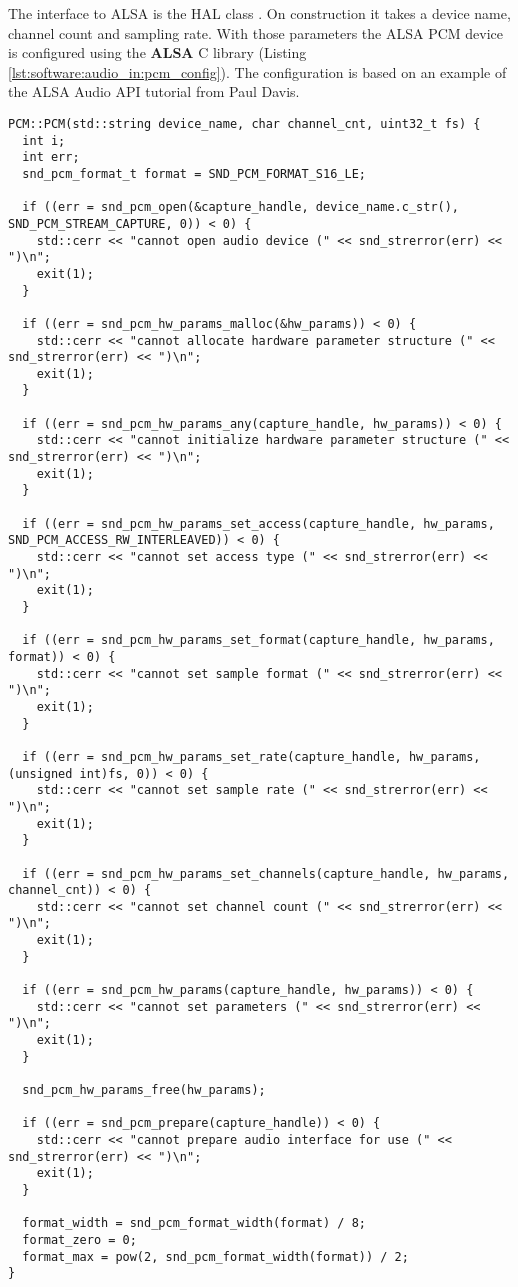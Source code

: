 The interface to ALSA is the HAL class . On construction it takes a device name, channel count and sampling rate. With those parameters the ALSA PCM device is configured using the \textbf{ALSA} C library (Listing \ref{lst:software:audio_in:pcm_config}).\cite{noauthor_alsa_nodate} The configuration is based on an example of the ALSA Audio API tutorial from Paul Davis.\cite{davis_tutorial_2002}\p
%
\begin{mdframed}
\begin{lstlisting}[caption=ALSA interface configuration, label=lst:software:audio_in:pcm_config]
PCM::PCM(std::string device_name, char channel_cnt, uint32_t fs) {
  int i;
  int err;
  snd_pcm_format_t format = SND_PCM_FORMAT_S16_LE;

  if ((err = snd_pcm_open(&capture_handle, device_name.c_str(), SND_PCM_STREAM_CAPTURE, 0)) < 0) {
    std::cerr << "cannot open audio device (" << snd_strerror(err) << ")\n";
    exit(1);
  }

  if ((err = snd_pcm_hw_params_malloc(&hw_params)) < 0) {
    std::cerr << "cannot allocate hardware parameter structure (" << snd_strerror(err) << ")\n";
    exit(1);
  }

  if ((err = snd_pcm_hw_params_any(capture_handle, hw_params)) < 0) {
    std::cerr << "cannot initialize hardware parameter structure (" << snd_strerror(err) << ")\n";
    exit(1);
  }

  if ((err = snd_pcm_hw_params_set_access(capture_handle, hw_params, SND_PCM_ACCESS_RW_INTERLEAVED)) < 0) {
    std::cerr << "cannot set access type (" << snd_strerror(err) << ")\n";
    exit(1);
  }

  if ((err = snd_pcm_hw_params_set_format(capture_handle, hw_params, format)) < 0) {
    std::cerr << "cannot set sample format (" << snd_strerror(err) << ")\n";
    exit(1);
  }

  if ((err = snd_pcm_hw_params_set_rate(capture_handle, hw_params, (unsigned int)fs, 0)) < 0) {
    std::cerr << "cannot set sample rate (" << snd_strerror(err) << ")\n";
    exit(1);
  }

  if ((err = snd_pcm_hw_params_set_channels(capture_handle, hw_params, channel_cnt)) < 0) {
    std::cerr << "cannot set channel count (" << snd_strerror(err) << ")\n";
    exit(1);
  }

  if ((err = snd_pcm_hw_params(capture_handle, hw_params)) < 0) {
    std::cerr << "cannot set parameters (" << snd_strerror(err) << ")\n";
    exit(1);
  }

  snd_pcm_hw_params_free(hw_params);

  if ((err = snd_pcm_prepare(capture_handle)) < 0) {
    std::cerr << "cannot prepare audio interface for use (" << snd_strerror(err) << ")\n";
    exit(1);
  }

  format_width = snd_pcm_format_width(format) / 8;
  format_zero = 0;
  format_max = pow(2, snd_pcm_format_width(format)) / 2;
}
\end{lstlisting}
\end{mdframed}
